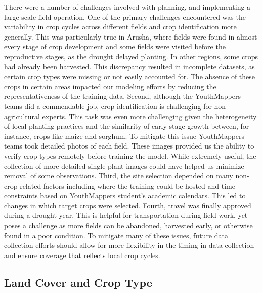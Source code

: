 \documentclass[
  journal,
  twocolumn]{IEEEtran}
\begin{document}
There were a number of challenges involved with planning, and
implementing a large-scale field operation. One of the primary
challenges encountered was the variability in crop cycles across
different fields and crop identification more generally. This was
particularly true in Arusha, where fields were found in almost every
stage of crop development and some fields were visited before the
reproductive stages, as the drought delayed planting. In other regions,
some crops had already been harvested. This discrepancy resulted in
incomplete datasets, as certain crop types were missing or not easily
accounted for. The absence of these crops in certain areas impacted our
modeling efforts by reducing the representativeness of the training
data. Second, although the YouthMappers teams did a commendable job,
crop identification is challenging for non-agricultural experts. This
task was even more challenging given the heterogeneity of local planting
practices and the similarity of early stage growth between, for
instance, crops like maize and sorghum. To mitigate this issue
YouthMappers teams took detailed photos of each field. These images
provided us the ability to verify crop types remotely before training
the model. While extremely useful, the collection of more detailed
single plant images could have helped us minimize removal of some
observations. Third, the site selection depended on many non-crop
related factors including where the training could be hosted and time
constraints based on YouthMappers student's academic calendars. This led
to changes in which target crops were selected. Fourth, travel was
finally approved during a drought year. This is helpful for
transportation during field work, yet poses a challenge as more fields
can be abandoned, harvested early, or otherwise found in a poor
condition. To mitigate many of these issues, future data collection
efforts should allow for more flexibility in the timing in data
collection and ensure coverage that reflects local crop cycles.

\subsection{Land Cover and Crop Type}\label{land-cover-and-crop-type}
\end{document}
